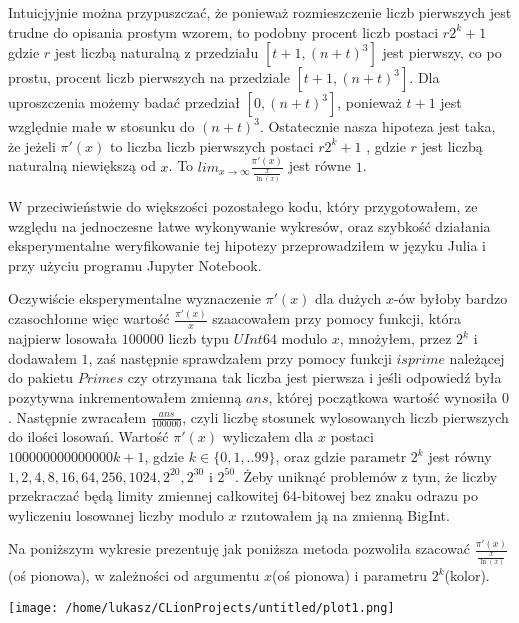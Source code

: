 \documentclass{article}
\begin{document}
Intuicjyjnie można przypuszczać, że ponieważ rozmieszczenie liczb pierwszych jest trudne 
do opisania prostym wzorem, to podobny procent liczb postaci $r2^k+1$ gdzie $r$ jest liczbą
naturalną z przedziału $[t+1,(n+t)^3]$ jest pierwszy, co po prostu, procent liczb 
pierwszych na przedziale $[t+1,(n+t)^3]$. Dla uproszczenia możemy badać przedział $[0,(n+t)^3]$, ponieważ $t+1$ jest względnie małe w stosunku do $(n+t)^3$. 
Ostatecznie nasza hipoteza jest taka, że jeżeli $\pi'(x)$ to liczba liczb pierwszych postaci $r2^k+1$ , gdzie $r$ jest
liczbą naturalną niewiększą od $x$. To $lim_{x \to \infty}\frac{\pi'(x)}{\frac{x}{\ln(x)}}$
jest równe $1$.

W przeciwieństwie do większości pozostałego kodu, który przygotowałem, ze względu na jednoczesne łatwe wykonywanie wykresów, oraz szybkość działania eksperymentalne weryfikowanie
tej hipotezy przeprowadziłem w języku Julia i przy użyciu programu Jupyter Notebook.

Oczywiście eksperymentalne wyznaczenie $\pi'(x)$ dla dużych $x$-ów byłoby bardzo czasochłonne więc wartość $\frac{\pi'(x)}{x}$ szaacowałem przy pomocy funkcji, która najpierw losowała $100000$
liczb typu $UInt64$ modulo $x$, mnożyłem, przez $2^k$ i dodawałem $1$, zaś następnie sprawdzałem przy pomocy funkcji
$isprime$ należącej do pakietu $Primes$ czy otrzymana 
tak liczba jest pierwsza i jeśli odpowiedź była pozytywna inkrementowałem zmienną $ans$, której 
początkowa wartość wynosiła $0$. Następnie zwracałem  $\frac{ans}{100000}$, czyli liczbę
stosunek wylosowanych liczb pierwszych do ilości losowań. Wartość $\pi'(x)$ wyliczałem dla $x$
postaci $100000000000000k+1$, gdzie $k \in \{0,1,..99\}$, oraz gdzie parametr $2^k$ jest równy
$1,2,4,8,16,64,256,1024,2^{20},2^{30}$ i $2^{50}$. Żeby uniknąć problemów z tym, że liczby
przekraczać będą limity zmiennej całkowitej $64$-bitowej bez znaku odrazu po wyliczeniu losowanej liczby
modulo $x$ rzutowałem ją na zmienną BigInt. 

Na poniższym wykresie prezentuję jak poniższa metoda pozwoliła szacować $\frac{\pi'(x)}{\frac{x}{\ln(x)}}$
(oś pionowa), w zależności od argumentu $x$(oś pionowa) i parametru $2^k$(kolor).

\begingroup
\centering
\texttt{[image: /home/lukasz/CLionProjects/untitled/plot1.png]}
\endgroup
\end{document}
